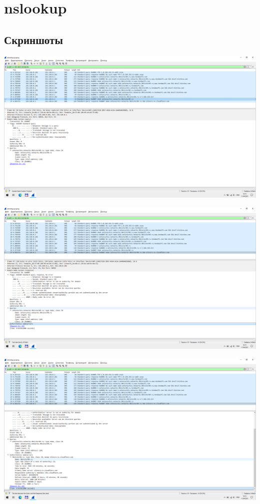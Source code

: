 
\section{nslookup}

\subsection{Скриншоты}

\begin{center}

    \includegraphics[width=\textwidth]{screenshots/nslookup_request_1}

    \includegraphics[width=\textwidth]{screenshots/nslookup_response_1}

    \includegraphics[width=\textwidth]{screenshots/nslookup_response_2}


\end{center}
